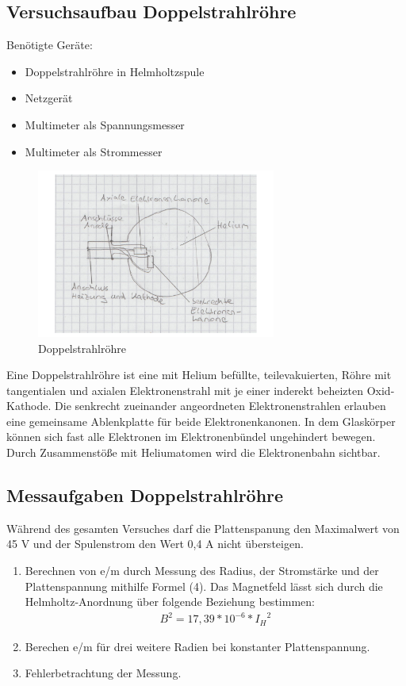 \documentclass[a4paper,10pt]{scrartcl}
\begin{document}
	\subsection{Versuchsaufbau Doppelstrahlröhre}
	Benötigte Geräte:
	\begin{itemize}
\item Doppelstrahlröhre in Helmholtzspule
\item Netzgerät
\item Multimeter als Spannungsmesser
\item Multimeter als Strommesser
\end{itemize}
\begin{figure}[h]
\centering
\includegraphics[width=0.7\textwidth]{./Bilder/emdoppel}
\caption{Doppelstrahlröhre}
\end{figure}
Eine Doppelstrahlröhre ist eine mit Helium befüllte, teilevakuierten, Röhre mit tangentialen und axialen Elektronenstrahl mit je einer inderekt beheizten Oxid-Kathode. Die senkrecht zueinander
angeordneten Elektronenstrahlen erlauben eine gemeinsame Ablenkplatte für beide Elektronenkanonen. In dem Glaskörper können sich fast alle Elektronen im Elektronenbündel ungehindert bewegen. 
Durch Zusammenstöße mit Heliumatomen wird die Elektronenbahn sichtbar.

\FloatBarrier
	\subsection{Messaufgaben Doppelstrahlröhre}
Während des gesamten Versuches darf die Plattenspanung den Maximalwert von 45 V und der Spulenstrom den Wert 0,4 A nicht übersteigen.
	 \begin{enumerate}
	 \item Berechnen von e/m durch Messung des Radius, der Stromstärke und der Plattenspannung mithilfe Formel (4).
	 Das
Magnetfeld lässt sich durch die Helmholtz-Anordnung über folgende Beziehung bestimmen:
\begin{align*}
B^2=17,39*10^{-6}*{I_H}^2
\end{align*}
	 \item Berechen e/m für drei weitere Radien bei konstanter Plattenspannung.
	 \item Fehlerbetrachtung der Messung.
	 \end{enumerate}
	
    
	
	
	
	
	
\end{document}
